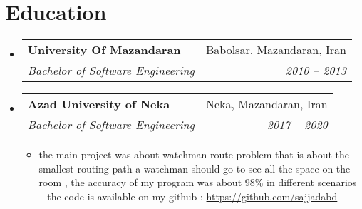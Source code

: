 \documentclass[A4,11pt]{article}
\makeatletter
\newcommand{\resumeSubheading}[4]{
  \vspace{-1pt}\item
    \begin{tabular*}{0.97\textwidth}[t]{l@{\extracolsep{\fill}}r}
      \textbf{#1} & #2 \\
      \textit{#3} & \textit{\small #4} \\
    \end{tabular*}\vspace{-5pt}
}
\newcommand{\resumeSubHeadingListStart}{\begin{itemize}[leftmargin=*]}
\newcommand{\resumeSubHeadingListEnd}{\end{itemize}}
\makeatother
\begin{document}
\vspace{-10pt}


\section{Education}
  \vspace{10pt}
  \resumeSubHeadingListStart
    \resumeSubheading
      {University Of Mazandaran}{Babolsar, Mazandaran, Iran}
      {Bachelor of Software Engineering}{2010 -- 2013}


      
      
      
    \resumeSubheading
      {Azad University of Neka}{Neka, Mazandaran, Iran}
      {Bachelor of Software Engineering}{2017 -- 2020}

    \vspace{5pt}
      
    \begin{itemize}
   \item the main project was about
    watchman route problem
    that is about the smallest routing
    path a watchman should go
    to see all the space on the
    room , the accuracy of my program was about 98\% in different scenarios – the code is  available on my github : \href{https://github.com/sajjadabd}{https://github.com/sajjadabd}
    \end{itemize}
      
  \resumeSubHeadingListEnd
\end{document}
